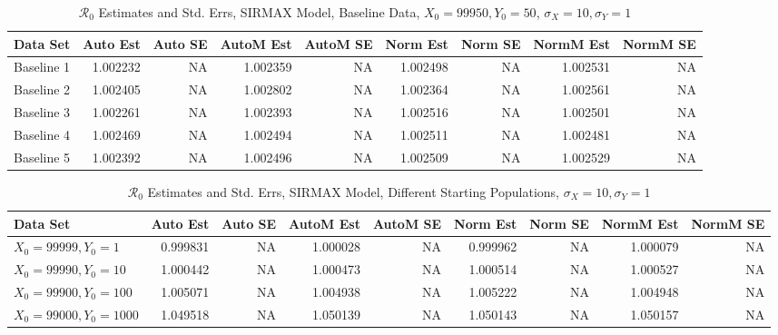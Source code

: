 \documentclass[12pt]{article}
\newcommand{\rr}{\ensuremath{\mathcal{R}_0}}
\begin{document}
\begin{table}[H]
	
	\caption{$\rr$ Estimates and Std. Errs, SIRMAX Model,
		Baseline Data, $X_0 = 99950, Y_0 = 50$, 
		$\sigma_X = 10, \sigma_Y = 1$}
	\begin{footnotesize}
		\hskip -1cm
		\begin{tabular}{l|r|r|r|r|r|r|r|r}
			\hline
			Data Set & Auto Est & Auto SE & AutoM Est & AutoM SE & Norm Est & Norm SE & NormM Est & NormM SE\\
			\hline
			Baseline 1 & 1.002232 & NA & 1.002359 & NA & 1.002498 & NA & 1.002531 & NA\\
			\hline
			Baseline 2 & 1.002405 & NA & 1.002802 & NA & 1.002364 & NA & 1.002561 & NA\\
			\hline
			Baseline 3 & 1.002261 & NA & 1.002393 & NA & 1.002516 & NA & 1.002501 & NA\\
			\hline
			Baseline 4 & 1.002469 & NA & 1.002494 & NA & 1.002511 & NA & 1.002481 & NA\\
			\hline
			Baseline 5 & 1.002392 & NA & 1.002496 & NA & 1.002509 & NA & 1.002529 & NA\\
			\hline
		\end{tabular}
	\end{footnotesize}
\end{table}

\begin{table}[H]
	
	\caption{$\rr$ Estimates and Std. Errs, SIRMAX Model,
		Different Starting Populations, 
		$\sigma_X = 10, \sigma_Y = 1$}
	\begin{footnotesize}
		\hskip -1.7cm
		\begin{tabular}{l|r|r|r|r|r|r|r|r}
			\hline
			Data Set & Auto Est & Auto SE & AutoM Est & AutoM SE & Norm Est & Norm SE & NormM Est & NormM SE\\
			\hline
			$X_0 = 99999, Y_0 = 1$ & 0.999831 & NA & 1.000028 & NA & 0.999962 & NA & 1.000079 & NA\\
			\hline
			$X_0 = 99990, Y_0 = 10$ & 1.000442 & NA & 1.000473 & NA & 1.000514 & NA & 1.000527 & NA\\
			\hline
			$X_0 = 99900, Y_0 = 100$ & 1.005071 & NA & 1.004938 & NA & 1.005222 & NA & 1.004948 & NA\\
			\hline
			$X_0 = 99000, Y_0 = 1000$ & 1.049518 & NA & 1.050139 & NA & 1.050143 & NA & 1.050157 & NA\\
			\hline
		\end{tabular}
	\end{footnotesize}
\end{table}
\end{document}
